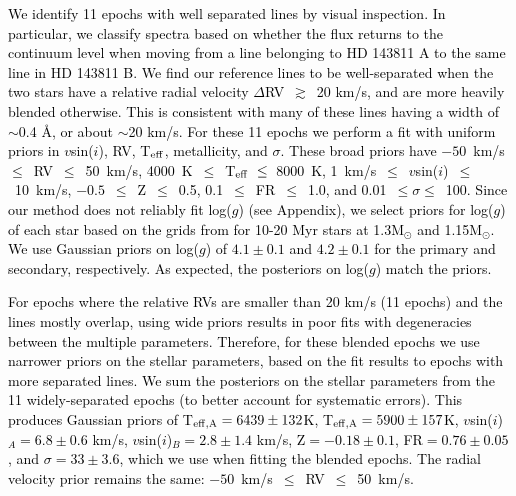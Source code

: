 \documentclass[]{aastex701} %
\begin{document}
\textcolor{black}{We identify 11 epochs with well separated lines by visual inspection. In particular, we classify spectra based on whether the flux returns to the continuum level when moving from a line belonging to HD 143811 A to the same line in HD 143811 B. We find our reference lines to be well-separated when the two stars have a relative radial velocity $\Delta$RV~$\gtrsim$~20 km/s, and are more heavily blended otherwise. This is consistent with many of these lines having a width of $\sim$0.4 \r{A}, or about $\sim$20 km/s.  For these 11 epochs we perform a fit with uniform priors in $v$sin($i$), RV, T$_{\rm eff}$, metallicity, and $\sigma$. These broad priors have $-50$~km/s~$\le$~RV~$\le$~50~km/s, 4000~K~$\le$~T$_{\rm eff}~\le$~8000~K, 1~km/s~$\le$~$v$sin($i$)~$\le$~10~km/s, $-0.5$~$\le$~Z~$\le$~0.5, 0.1~$\le$~FR~$\le$~1.0, and 0.01~$\le\sigma\le$~100. Since our method does not reliably fit log($g$) (see Appendix), we select priors for log($g$) of each star based on the grids from \citet{Baraffe:2015} for 10-20 Myr stars at 1.3M$_\odot$ and 1.15M$_\odot$. We use Gaussian priors on log($g$) of $4.1 \pm 0.1$ and $4.2 \pm 0.1$ for the primary and secondary, respectively. As expected, the posteriors on log($g$) match the priors.}

\textcolor{black}{For epochs where the relative RVs are smaller than 20 km/s (11 epochs) and the lines mostly overlap, using wide priors results in poor fits with degeneracies between the multiple parameters. Therefore, for these blended epochs we use narrower priors on the stellar parameters, based on the fit results to epochs with more separated lines. We sum the posteriors on the stellar parameters from the 11 widely-separated epochs (to better account for systematic errors). This produces Gaussian priors of T$_{\rm eff,A} = 6439 \pm 132$K, T$_{\rm eff,A} = 5900 \pm 157$K, $v$sin($i$)$_A = 6.8 \pm 0.6$ km/s, $v$sin($i$)$_B = 2.8 \pm 1.4$ km/s, Z$=-0.18 \pm 0.1$, FR$ = 0.76 \pm 0.05$, and $\sigma = 33 \pm 3.6$, which we use when fitting the blended epochs. The radial velocity prior remains the same: $-50$~km/s~$\le$~RV~$\le$~50~km/s.}  
\end{document}
